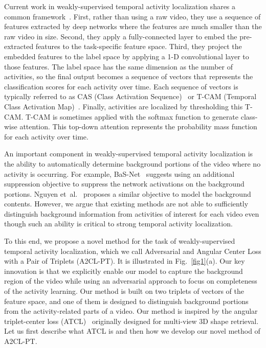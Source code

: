 \documentclass[runningheads]{llncs}
\newcommand{\etal}{et~al.}
\newcommand{\tcam}{\mbox{T-CAM}}
\newcommand{\ourlossnamelong}{Adversarial and Angular Center Loss with a Pair of Triplets}
\newcommand{\ourlossname}{\mbox{A2CL-PT}}
\newcommand{\atclossname}{\mbox{ATCL}}
\begin{document}
Current work in weakly-supervised temporal activity localization shares a common framework~\cite{liu2019completeness,narayan20193c,nguyen2018weakly,paul2018w,lee2020background}. First, rather than using a raw video, they use a sequence of features extracted by deep networks where the features are much smaller than the raw video in size. Second, they apply a fully-connected layer to embed the pre-extracted features to the task-specific feature space. Third, they project the embedded features to the label space by applying a 1-D convolutional layer to those features. The label space has the same dimension as the number of activities, so the final output becomes a sequence of vectors that represents the classification scores for each activity over time. Each sequence of vectors is typically referred to as CAS (Class Activation Sequence)~\cite{shou2018autoloc} or \tcam{} (Temporal Class Activation Map)~\cite{nguyen2018weakly}. Finally, activities are localized by thresholding this \tcam{}. \tcam{} is sometimes applied with the softmax function to generate class-wise attention. This top-down attention represents the probability mass function for each activity over time.

An important component in weakly-supervised temporal activity localization is the ability to automatically determine background portions of the video where no activity is occurring. For example, \mbox{BaS-Net}~\cite{lee2020background} suggests using an additional suppression objective to suppress the network activations on the background portions. Nguyen \etal{}~\cite{nguyen2019weakly} proposes a similar objective to model the background contents. However, we argue that existing methods are not able to sufficiently distinguish background information from activities of interest for each video even though such an ability is critical to strong temporal activity localization.

To this end, we propose a novel method for the task of weakly-supervised temporal activity localization, which we call \ourlossnamelong{} (\ourlossname{}). It is illustrated in Fig.~\ref{fig1}(a). Our key innovation is that we explicitly enable our model to capture the background region of the video while using an adversarial approach to focus on completeness of the activity learning. Our method is built on two triplets of vectors of the feature space, and one of them is designed to distinguish background portions from the activity-related parts of a video. Our method is inspired by the angular triplet-center loss (\atclossname{})~\cite{li2019angular} originally designed for multi-view 3D shape retrieval. Let us first describe what \atclossname{} is and then how we develop our novel method of \ourlossname{}.
\end{document}
